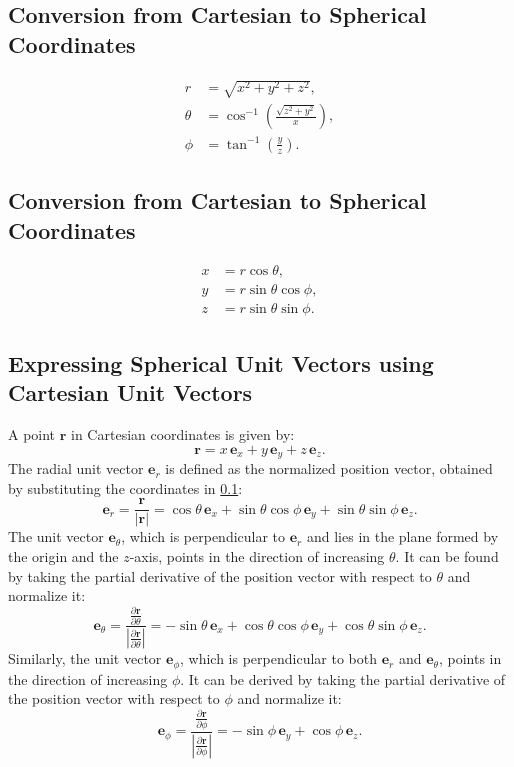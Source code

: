 \subsection{Conversion from Cartesian to Spherical Coordinates} \label{Conversion from Cartesian to Spherical Coordinates}
\begin{align}
    r &= \sqrt{x^2 + y^2 + z^2}, \\
    \theta &= \cos^{-1} \left(\frac{\sqrt{z^2 + y^2}}{x}\right), \\
    \phi &= \tan^{-1} \left(\frac{y}{z}\right).
\end{align}

\subsection{Conversion from Cartesian to Spherical Coordinates} \label{Conversion from Spherical to Cartesian Coordinates}
\begin{align}
    x &= r \cos \theta, \\
    y &= r \sin \theta \cos \phi, \\
    z &= r \sin \theta \sin \phi.   
\end{align}

\subsection{Expressing Spherical Unit Vectors using Cartesian Unit Vectors}
A point $\mathbf{r}$ in Cartesian coordinates is given by:
\[
\mathbf{r} = x \, \mathbf{e}_x + y \, \mathbf{e}_y + z \, \mathbf{e}_z.
\]
The radial unit vector \( \mathbf{e}_r \) is defined as the normalized position vector, obtained by substituting the coordinates in \ref{Conversion from Cartesian to Spherical Coordinates}:
\begin{equation}
    \mathbf{e}_r = \frac{\mathbf{r}}{|\mathbf{r}|} = \cos\theta \, \mathbf{e}_x + \sin\theta \cos\phi \, \mathbf{e}_y + \sin\theta \sin\phi  \, \mathbf{e}_z.
    \label{e_r}
\end{equation}
The unit vector \( \mathbf{e}_\theta \), which is perpendicular to \( \mathbf{e}_r \) and lies in the plane formed by the origin and the \( z \)-axis, points in the direction of increasing \( \theta \). It can be found by taking the partial derivative of the position vector with respect to \( \theta \) and normalize it:
\begin{equation}
    \mathbf{e}_\theta = \frac{\frac{\partial \mathbf{r}}{\partial \theta}}{|\frac{\partial \mathbf{r}}{\partial \theta}|} = -\sin\theta \, \mathbf{e}_x + \cos\theta \cos\phi \, \mathbf{e}_y + \cos\theta \sin\phi \, \mathbf{e}_z.
    \label{e_theta}
\end{equation}
Similarly, the unit vector \( \mathbf{e}_\phi \), which is perpendicular to both \( \mathbf{e}_r \) and \( \mathbf{e}_\theta \), points in the direction of increasing \( \phi \). It can be derived by taking the partial derivative of the position vector with respect to \( \phi \) and normalize it:
\[
\mathbf{e}_\phi = \frac{\frac{\partial \mathbf{r}}{\partial \phi}}{|\frac{\partial \mathbf{r}}{\partial \phi}|} = - \sin\phi  \, \mathbf{e}_y + \cos\phi \, \mathbf{e}_z.
\]

